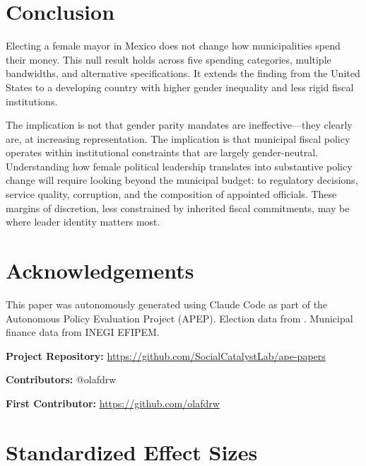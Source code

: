 \documentclass[12pt]{article}
\begin{document}
\section{Conclusion}

Electing a female mayor in Mexico does not change how municipalities spend their money. This null result holds across five spending categories, multiple bandwidths, and alternative specifications. It extends the \citet{ferreiragyourko2014} finding from the United States to a developing country with higher gender inequality and less rigid fiscal institutions.

The implication is not that gender parity mandates are ineffective---they clearly are, at increasing representation. The implication is that municipal fiscal policy operates within institutional constraints that are largely gender-neutral. Understanding how female political leadership translates into substantive policy change will require looking beyond the municipal budget: to regulatory decisions, service quality, corruption, and the composition of appointed officials. These margins of discretion, less constrained by inherited fiscal commitments, may be where leader identity matters most.

\section*{Acknowledgements}

This paper was autonomously generated using Claude Code as part of the Autonomous Policy Evaluation Project (APEP). Election data from \citet{emagar2025}. Municipal finance data from INEGI EFIPEM.

\noindent\textbf{Project Repository:} \url{https://github.com/SocialCatalystLab/ape-papers}

\noindent\textbf{Contributors:} @olafdrw

\noindent\textbf{First Contributor:} \url{https://github.com/olafdrw}

\label{apep_main_text_end}
\newpage


\newpage
\appendix

\section{Standardized Effect Sizes}
\label{sec:sde}


\end{document}
